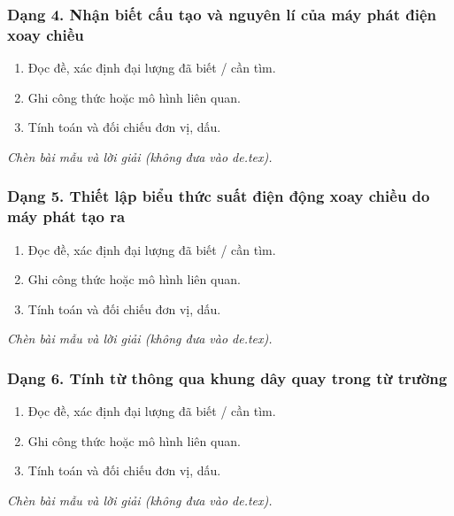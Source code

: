 \subsubsection{Dạng 4. Nhận biết cấu tạo và nguyên lí của máy phát điện xoay chiều}
\begin{phuongphap}
\begin{enumerate}
\item Đọc đề, xác định đại lượng đã biết / cần tìm.
\item Ghi công thức hoặc mô hình liên quan.
\item Tính toán và đối chiếu đơn vị, dấu.
\end{enumerate}
\end{phuongphap}
\begin{vidumau}
\textit{Chèn bài mẫu và lời giải (không đưa vào de.tex).}
\end{vidumau}

\subsubsection{Dạng 5. Thiết lập biểu thức suất điện động xoay chiều do máy phát tạo ra}
\begin{phuongphap}
\begin{enumerate}
\item Đọc đề, xác định đại lượng đã biết / cần tìm.
\item Ghi công thức hoặc mô hình liên quan.
\item Tính toán và đối chiếu đơn vị, dấu.
\end{enumerate}
\end{phuongphap}
\begin{vidumau}
\textit{Chèn bài mẫu và lời giải (không đưa vào de.tex).}
\end{vidumau}

\subsubsection{Dạng 6. Tính từ thông qua khung dây quay trong từ trường}
\begin{phuongphap}
\begin{enumerate}
\item Đọc đề, xác định đại lượng đã biết / cần tìm.
\item Ghi công thức hoặc mô hình liên quan.
\item Tính toán và đối chiếu đơn vị, dấu.
\end{enumerate}
\end{phuongphap}
\begin{vidumau}
\textit{Chèn bài mẫu và lời giải (không đưa vào de.tex).}
\end{vidumau}

